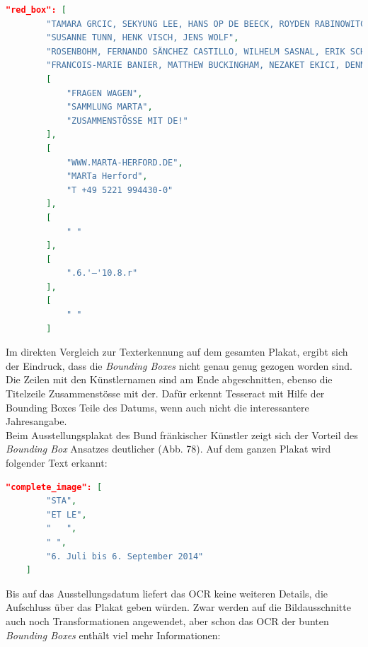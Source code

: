\documentclass[a4paper,12pt,ngerman]{article}
\begin{document}
\begin{lstlisting}[language=json,escapeinside='']
	"red_box": [
        "TAMARA GRCIC, SEKYUNG LEE, HANS OP DE BEECK, ROYDEN RABINOWITCH, LAR",
        "SUSANNE TUNN, HENK VISCH, JENS WOLF",
        "ROSENBOHM, FERNANDO SÄNCHEZ CASTILLO, WILHELM SASNAL, ERIK SCHMIDI",
        "FRANCOIS-MARIE BANIER, MATTHEW BUCKINGHAM, NEZAKET EKICI, DENNIS FES|",
        [
            "FRAGEN WAGEN",
            "SAMMLUNG MARTA",
            "ZUSAMMENSTÖSSE MIT DE!"
        ],
        [
            "WWW.MARTA-HERFORD.DE",
            "MARTa Herford",
            "T +49 5221 994430-0"
        ],
        [
            " "
        ],
        [
            ".6.'—'10.8.r"
        ],
        [
            " "
        ]
\end{lstlisting}
Im direkten Vergleich zur Texterkennung auf dem gesamten Plakat, ergibt sich der Eindruck, dass die \textit{Bounding Boxes} nicht genau genug gezogen worden sind. Die Zeilen mit den Künstlernamen sind am Ende abgeschnitten, ebenso die Titelzeile \glqq Zusammenstösse mit der\grqq. Dafür erkennt Tesseract mit Hilfe der Bounding Boxes Teile des Datums, wenn auch nicht die interessantere Jahresangabe. \\

Beim Ausstellungsplakat des Bund fränkischer Künstler zeigt sich der Vorteil des \textit{Bounding Box} Ansatzes deutlicher (Abb. 78). Auf dem ganzen Plakat wird folgender Text erkannt:

\begin{lstlisting}[language=json,escapeinside='']
	"complete_image": [
        "STA",
        "ET LE",
        "   ",
        " ",
        "6. Juli bis 6. September 2014"
    ]
\end{lstlisting}

Bis auf das Ausstellungsdatum liefert das OCR keine weiteren Details, die Aufschluss über das Plakat geben würden. Zwar werden auf die Bildausschnitte auch noch Transformationen angewendet, aber schon das OCR der bunten \textit{Bounding Boxes} enthält viel mehr Informationen:
\end{document}
